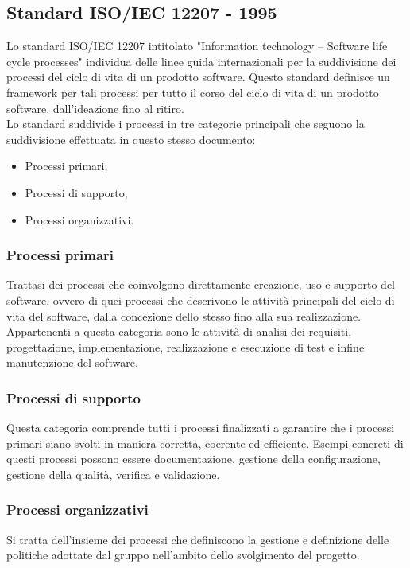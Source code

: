 \documentclass[10pt]{article}
\begin{document}
\begin{justify}
    \subsection{Standard ISO/IEC 12207 - 1995}
    \label{standard_12207}
    Lo standard ISO/IEC 12207 intitolato "Information technology – Software life cycle processes" individua delle linee guida internazionali per la suddivisione dei processi del ciclo di vita  di un prodotto software. Questo standard definisce un framework per tali processi per tutto il corso del ciclo di vita di un prodotto software, dall'ideazione fino al ritiro.\\
    Lo standard suddivide i processi in tre categorie principali che seguono la suddivisione effettuata in questo stesso documento:
    \begin{itemize}
        \item Processi primari;
        \item Processi di supporto;
        \item Processi organizzativi.
    \end{itemize}

        \subsubsection{Processi primari}
        Trattasi dei processi che coinvolgono direttamente creazione, uso e supporto del software, ovvero di quei processi che descrivono
        le attività principali del ciclo di vita del software, dalla concezione dello stesso fino alla sua realizzazione. Appartenenti a questa categoria sono le attività di analisi-dei-requisiti, progettazione, implementazione, realizzazione e esecuzione di test e infine manutenzione del software.

        \subsubsection{Processi di supporto}
        Questa categoria comprende tutti i processi finalizzati a garantire che i processi primari siano svolti in maniera corretta, coerente ed efficiente. Esempi concreti di questi processi possono essere documentazione, gestione della configurazione, gestione della qualità, verifica e validazione.

        \subsubsection{Processi organizzativi}
        Si tratta dell'insieme dei processi che definiscono la gestione e definizione delle politiche adottate dal gruppo nell'ambito dello
        svolgimento del progetto.


\end{justify}
\end{document}
